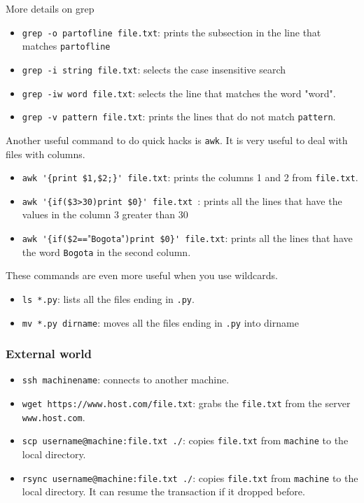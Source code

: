 \documentclass{article}
\begin{document}
More details on grep
\begin{itemize}
\item\verb"grep -o partofline file.txt": prints the subsection in the
  line that matches \verb"partofline"
\item\verb"grep -i string file.txt": selects the case insensitive
  search
\item\verb"grep -iw word file.txt": selects the line that matches the
  word "word".
\item\verb"grep -v pattern file.txt": prints the lines that do not match \verb"pattern".
\end{itemize}

Another useful command to do quick hacks is \verb"awk". It is very useful to
deal with files with columns.
\begin{itemize}
\item\verb"awk '{print $1,$2;}' file.txt": prints the columns 1 and 2
  from \verb"file.txt".
\item\verb"awk '{if($3>30)print $0}' file.txt ": prints all the lines
  that have the values in the column 3 greater than 30
\item\verb"awk '{if($2==""\verb"Bogota""\verb")print $0}' file.txt":
  prints all the lines that have the word \verb"Bogota" in the second column.
\end{itemize} 



These commands are even more useful when you use wildcards.
\begin{itemize}
\item\verb"ls *.py": lists all the files ending in \verb".py".
\item\verb"mv *.py dirname": moves all the files ending in \verb".py" into dirname
\end{itemize}

\subsubsection*{External world}


\begin{itemize}
\item\verb"ssh machinename": connects to another machine.
\item\verb"wget https://www.host.com/file.txt": grabs the \verb"file.txt" from the server \verb"www.host.com".
\item\verb"scp username@machine:file.txt ./": copies \verb"file.txt" from \verb"machine" to the local directory. 
\item\verb"rsync username@machine:file.txt ./": copies \verb"file.txt" from \verb"machine" to the local directory. It can resume the transaction if it dropped before.
\end{itemize}
\end{document}
